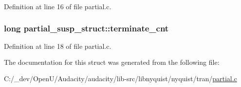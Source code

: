Definition at line 16 of file partial.\+c.

\subsubsection[{\texorpdfstring{terminate\+\_\+cnt}{terminate_cnt}}]{\setlength{\rightskip}{0pt plus 5cm}long partial\+\_\+susp\+\_\+struct\+::terminate\+\_\+cnt}\hypertarget{structpartial__susp__struct_a88e1f562fa6881f6f2d04740d865cb30}{}\label{structpartial__susp__struct_a88e1f562fa6881f6f2d04740d865cb30}


Definition at line 18 of file partial.\+c.



The documentation for this struct was generated from the following file\+:\begin{DoxyCompactItemize}
\item 
C\+:/\+\_\+dev/\+Open\+U/\+Audacity/audacity/lib-\/src/libnyquist/nyquist/tran/\hyperlink{partial_8c}{partial.\+c}\end{DoxyCompactItemize}
